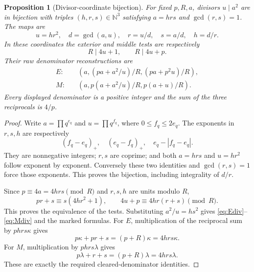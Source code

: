 \documentclass[11pt]{article}
\newtheorem{proposition}[theorem]{Proposition}
\theoremstyle{remark}\newtheorem{remark}[theorem]{Remark}
\newcommand{\N}{\mathbb N}
\begin{document}
\begin{proposition}[Divisor-coordinate bijection]\label{prop:divisor}
For fixed $p,R,a$, divisors $u\mid a^2$ are in bijection with triples $(h,r,s)\in\N^3$ satisfying $a=hrs$ and $\gcd(r,s)=1$. The maps are
\begin{equation}\label{eq:decode}
 u=hr^2,\quad d=\gcd(a,u),\quad r=u/d,\quad s=a/d,\quad h=d/r.
\end{equation}
In these coordinates the exterior and middle tests are respectively
\begin{equation}\label{eq:divtests}
 R\mid4u+1,\qquad R\mid4u+p.
\end{equation}
Their raw denominator reconstructions are
\begin{align}
 E:\quad &(a,(pa+a^2/u)/R,(pa+p^2u)/R),\label{eq:Ediv}\\
 M:\quad &(a,p(a+a^2/u)/R,p(a+u)/R).\label{eq:Mdiv}
\end{align}
Every displayed denominator is a positive integer and the sum of the three reciprocals is $4/p$.
\end{proposition}
\begin{proof}
Write $a=\prod q^{e_q}$ and $u=\prod q^{f_q}$, where $0\le f_q\le2e_q$. The exponents in $r,s,h$ are respectively
\[
 (f_q-e_q)_+,\quad(e_q-f_q)_+,\quad e_q-|f_q-e_q|.
\]
They are nonnegative integers; $r,s$ are coprime; and both $a=hrs$ and $u=hr^2$ follow exponent by exponent. Conversely these two identities and $\gcd(r,s)=1$ force those exponents. This proves the bijection, including integrality of $d/r$.

Since $p\equiv4a=4hrs\pmod R$ and $r,s,h$ are units modulo $R$,
\[
 pr+s\equiv s(4hr^2+1),\qquad
 4u+p\equiv4hr(r+s)\pmod R.
\]
This proves the equivalence of the tests. Substituting $a^2/u=hs^2$ gives \eqref{eq:Ediv}--\eqref{eq:Mdiv} and the marked formulas. For $E$, multiplication of the reciprocal sum by $phrs\kappa$ gives
\[
 p\kappa+pr+s=(p+R)\kappa=4hrs\kappa.
\]
For $M$, multiplication by $phrs\lambda$ gives
\[
 p\lambda+r+s=(p+R)\lambda=4hrs\lambda.
\]
These are exactly the required cleared-denominator identities.
\end{proof}
\end{document}
